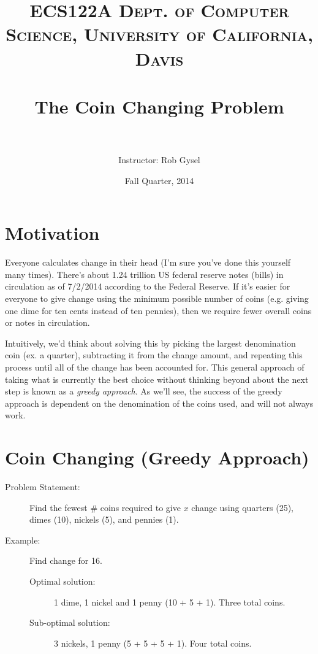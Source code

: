 \documentclass[paper=a4, fontsize=11pt]{scrartcl} %
\title{	
\normalfont \normalsize 
\textsc{ECS122A Dept. of Computer Science, University of California, Davis} \\ [25pt] %
\horrule{0.5pt} \\[0.4cm] %
\huge The Coin Changing Problem \\ %
\horrule{2pt} \\[0.5cm] %
}
\author{Instructor: Rob Gysel} %
\date{Fall Quarter, 2014} %
\numberwithin{equation}{section} %
\numberwithin{figure}{section} %
\numberwithin{table}{section} %
\begin{document}
\maketitle

\section{Motivation}
Everyone calculates change in their head (I'm sure you've done this yourself many times). There's about 1.24 trillion US federal reserve notes (bills) in circulation as of 7/2/2014 according to the Federal Reserve. If it's easier for everyone to give change using the minimum possible number of coins (e.g. giving one dime for ten cents instead of ten pennies), then we require fewer overall coins or notes in circulation.

Intuitively, we'd think about solving this by picking the largest denomination coin (ex. a quarter), subtracting it from the change amount, and repeating this process until all of the change has been accounted for. This general approach of taking what is currently the best choice without thinking beyond about the next step is known as a \emph{greedy approach}. As we'll see, the success of the greedy approach is dependent on the denomination of the coins used, and will not always work.

\section{Coin Changing (Greedy Approach)}
\begin{description}
\item[Problem Statement:] Find the fewest \# coins required to give $x$ change using quarters (25\cent), dimes (10\cent), nickels (5\cent), and pennies (1\cent).
\item[Example:] Find change for 16\cent.
    \begin{description}
    \item[Optimal solution:] 1 dime, 1 nickel and 1 penny (10 + 5 + 1). Three total coins.
    \item[Sub-optimal solution:] 3 nickels, 1 penny (5 + 5 + 5 + 1). Four total coins.
    \end{description}
\end{description}
\end{document}
